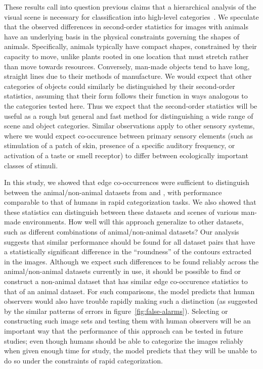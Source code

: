 \documentclass{article}%
\begin{document}
These results call into question previous claims that a hierarchical
analysis of the visual scene is necessary 
for classification into high-level categories~\citep{Serre07}. 
We speculate that the observed differences in second-order statistics for images
with animals have an underlying basis in the physical constraints 
governing the shapes of animals. 
Specifically, animals typically have compact shapes, constrained by
their capacity to move, unlike plants rooted
in one location that must stretch rather than move towards resources.
Conversely, man-made objects tend to have long, straight lines due to
their methods of manufacture.  We would
expect that other categories of objects could similarly be
distinguished by their second-order statistics, assuming that their
form %
follows their function in ways analogous to the categories tested
here.  Thus we expect that the second-order statistics will be useful
as a rough but general and fast method for distinguishing a wide range
of scene and object categories.  Similar observations apply to other
sensory systems, where we would expect co-occurence between primary
sensory elements (such as stimulation of a patch of skin, presence of
a specific auditory frequency, or activation of a taste or smell
receptor) to differ between ecologically important classes of stimuli.

   In this study, we showed that edge co-occurrences were sufficient
   to distinguish between the animal/non-animal datasets from
   \citet{Serre07} and \citet{Kirchner06}, with performance comparable
   to that of humans in rapid categorization tasks.  We also showed
   that these statistics can distinguish between these datasets and
   scenes of various man-made environments.  How well will this
   approach generalize to other datasets, such as different
   combinations of animal/non-animal datasets?  Our analysis suggests
   that similar performance should be found for all dataset pairs that
   have a statistically significant difference in the ``roundness'' of
   the contours extracted in the images.  Although we expect such
   differences to be found reliably across the animal/non-animal
   datasets currently in use, it should be possible to find or
   construct a non-animal dataset that has similar edge co-occurence
   statistics to that of an animal dataset. For such comparisons, the
   model predicts that human observers would also have trouble rapidly
   making such a distinction (as suggested by the similar patterns of
   errors in figure~\ref{fig:false-alarms}).  Selecting or constructing such image
   sets and testing them with human observers will be an important way
   that the performance of this approach can be tested in future
   studies; even though humans should be able to categorize the images
   reliably when given enough time for study, the model predicts that
   they will be unable to do so under the constraints of rapid
   categorization.
\end{document}
